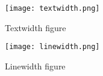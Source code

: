 \documentclass[letterpaper, 10pt, twocolumn]{article}
\begin{document}
\begin{figure*}[hp]
\centering
\texttt{[image: textwidth.png]}
\caption{Textwidth figure}
\end{figure*}

\begin{figure}[hp]
\centering
\texttt{[image: linewidth.png]}
\caption{Linewidth figure}
\end{figure}
\end{document}
